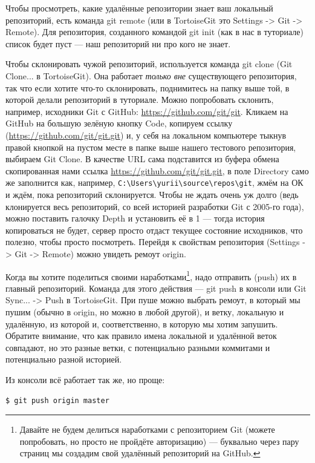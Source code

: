 \documentclass{../text-style}
\begin{document}
Чтобы просмотреть, какие удалённые репозитории знает ваш локальный репозиторий, есть команда git remote (или в TortoiseGit это Settings -> Git -> Remote). Для репозитория, созданного командой git init (как в нас в туториале) список будет пуст --- наш репозиторий ни про кого не знает.

Чтобы склонировать чужой репозиторий, используется команда git clone (Git Clone... в TortoiseGit). Она работает \emph{только вне} существующего репозитория, так что если хотите что-то склонировать, поднимитесь на папку выше той, в которой делали репозиторий в туториале. Можно попробовать склонить, например, исходники Git с GitHub: \url{https://github.com/git/git}. Кликаем на GitHub на большую зелёную кнопку Code, копируем ссылку (\url{https://github.com/git/git.git}) и, у себя на локальном компьютере тыкнув правой кнопкой на пустом месте в папке выше нашего тестового репозитория, выбираем Git Clone. В качестве URL сама подставится из буфера обмена скопированная нами ссылка \url{https://github.com/git/git.git}, в поле Directory само же заполнится как, например, \verb|C:\Users\yurii\source\repos\git|, жмём на ОК и ждём, пока репозиторий склонируется. Чтобы не ждать очень уж долго (ведь клонируется весь репозиторий, со всей историей разработки Git с 2005-го года), можно поставить галочку Depth и установить её в 1 --- тогда история копироваться не будет, сервер просто отдаст текущее состояние исходников, что полезно, чтобы просто посмотреть. Перейдя к свойствам репозитория (Settings -> Git -> Remote) можно увидеть ремоут origin.

Когда вы хотите поделиться своими наработками\footnote{Давайте не будем делиться наработками с репозиторием Git (можете попробовать, но просто не пройдёте авторизацию) --- буквально через пару страниц мы создадим свой удалённый репозиторий на GitHub.}, надо отправить (push) их в главный репозиторий. Команда для этого действия --- git push в консоли или Git Sync... -> Push в TortoiseGit. При пуше можно выбрать ремоут, в который мы пушим (обычно в origin, но можно в любой другой), и ветку, локальную и удалённую, из которой и, соответственно, в которую мы хотим запушить. Обратите внимание, что как правило имена локальной и удалённой веток совпадают, но это разные ветки, с потенциально разными коммитами и потенциально разной историей.

Из консоли всё работает так же, но проще:

\begin{verbatim}
$ git push origin master
\end{verbatim}
\end{document}
